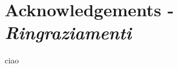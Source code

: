 \chapter*{Acknowledgements - \textit{Ringraziamenti}}

\begin{otherlanguage}{italian}
ciao
\end{otherlanguage}